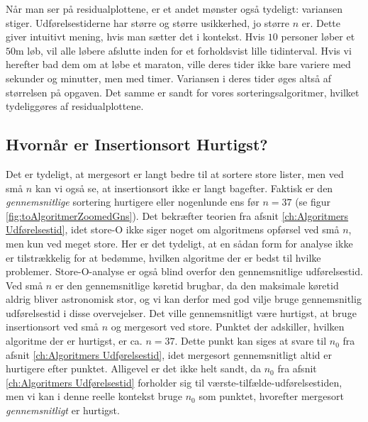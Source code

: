 Når man ser på residualplottene, er et andet mønster også tydeligt: variansen stiger. Udførelsestiderne har større og større usikkerhed, jo større $n$ er. Dette giver intuitivt mening, hvis man sætter det i kontekst. Hvis $10$ personer løber et $50$m løb, vil alle løbere afslutte inden for et forholdsvist lille tidinterval. Hvis vi herefter bad dem om at løbe et maraton, ville deres tider ikke bare variere med sekunder og minutter, men med timer. Variansen i deres tider øges altså af størrelsen på opgaven. Det samme er sandt for vores sorteringsalgoritmer, hvilket tydeliggøres af residualplottene. 


\subsection{Hvornår er Insertionsort Hurtigst?}%
\label{sub:Store-O er Værste Tilfælde}
Det er tydeligt, at mergesort er langt bedre til at sortere store lister, men ved små $n$ kan vi også se, at insertionsort ikke er langt bagefter. Faktisk er den \emph{gennemsnitlige} sortering hurtigere eller nogenlunde ens før $n = 37$ (se figur \ref{fig:toAlgoritmerZoomedGns}). Det bekræfter teorien fra afsnit \ref{ch:Algoritmers Udførelsestid}, idet store-O ikke siger noget om algoritmens opførsel ved små $n$, men kun ved meget store. Her er det tydeligt, at en sådan form for analyse ikke er tilstrækkelig for at bedømme, hvilken algoritme der er bedst til hvilke problemer. Store-O-analyse er også blind overfor den gennemsnitlige udførelsestid. Ved små $n$ er den gennemsnitlige køretid brugbar, da den maksimale køretid aldrig bliver astronomisk stor, og vi kan derfor med god vilje bruge gennemsnitlig udførelsestid i disse overvejelser. Det ville gennemsnitligt være hurtigst, at bruge insertionsort ved små $n$ og mergesort ved store. Punktet der adskiller, hvilken algoritme der er hurtigst, er ca. $n = 37$. Dette punkt kan siges at svare til $n_0$ fra afsnit \ref{ch:Algoritmers Udførelsestid}, idet mergesort gennemsnitligt altid er hurtigere efter punktet. Alligevel er det ikke helt sandt, da $n_0$ fra afsnit \ref{ch:Algoritmers Udførelsestid} forholder sig til værste-tilfælde-udførelsestiden, men vi kan i denne reelle kontekst bruge $n_0$ som punktet, hvorefter mergesort \emph{gennemsnitligt} er hurtigst.




